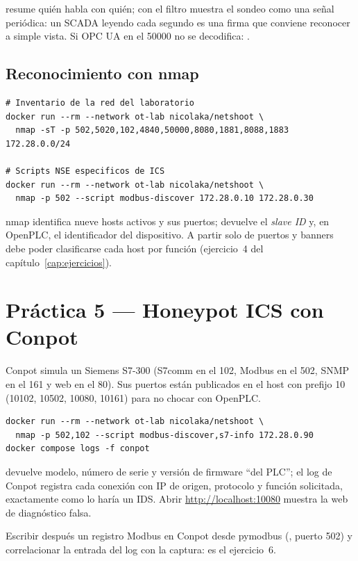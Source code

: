  resume quién habla con quién;  con el filtro  muestra el sondeo como una señal periódica: un SCADA leyendo cada segundo es una firma que conviene reconocer a simple vista. Si OPC UA en el 50000 no se decodifica: .

\subsection{Reconocimiento con nmap}

\begin{lstlisting}[style=bash]
# Inventario de la red del laboratorio
docker run --rm --network ot-lab nicolaka/netshoot \
  nmap -sT -p 502,5020,102,4840,50000,8080,1881,8088,1883 172.28.0.0/24

# Scripts NSE especificos de ICS
docker run --rm --network ot-lab nicolaka/netshoot \
  nmap -p 502 --script modbus-discover 172.28.0.10 172.28.0.30
\end{lstlisting}

\begin{ok}
nmap identifica nueve hosts activos y sus puertos;  devuelve el \emph{slave ID} y, en OpenPLC, el identificador del dispositivo. A partir solo de puertos y banners debe poder clasificarse cada host por función (ejercicio~4 del capítulo~\ref{cap:ejercicios}).
\end{ok}

\section{Práctica 5 --- Honeypot ICS con Conpot}
\label{sec:prac-conpot}

Conpot simula un Siemens S7-300 (S7comm en el 102, Modbus en el 502, SNMP en el 161 y web en el 80). Sus puertos están publicados en el host con prefijo 10 (10102, 10502, 10080, 10161) para no chocar con OpenPLC.

\begin{lstlisting}[style=bash]
docker run --rm --network ot-lab nicolaka/netshoot \
  nmap -p 502,102 --script modbus-discover,s7-info 172.28.0.90
docker compose logs -f conpot
\end{lstlisting}

\begin{ok}
 devuelve modelo, número de serie y versión de firmware ``del PLC''; el log de Conpot registra cada conexión con IP de origen, protocolo y función solicitada, exactamente como lo haría un IDS. Abrir \url{http://localhost:10080} muestra la web de diagnóstico falsa.
\end{ok}

Escribir después un registro Modbus en Conpot desde pymodbus (\ip{172.28.0.90}, puerto 502) y correlacionar la entrada del log con la captura: es el ejercicio~6.
